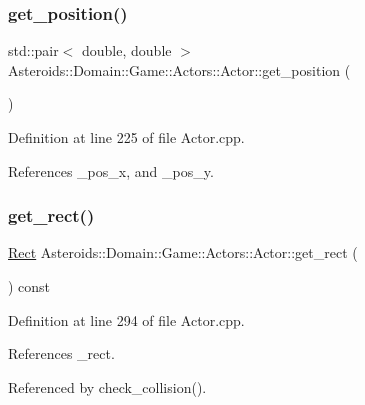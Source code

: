 \subsubsection{\texorpdfstring{get\+\_\+position()}{get\_position()}}
{\footnotesize\ttfamily std\+::pair$<$ double, double $>$ Asteroids\+::\+Domain\+::\+Game\+::\+Actors\+::\+Actor\+::get\+\_\+position (\begin{DoxyParamCaption}{ }\end{DoxyParamCaption})}



Definition at line 225 of file Actor.\+cpp.



References \+\_\+pos\+\_\+x, and \+\_\+pos\+\_\+y.

\mbox{\label{classAsteroids_1_1Domain_1_1Game_1_1Actors_1_1Actor_a445d9ee9ca02625b5385727aa4cbab1b}} 
\subsubsection{\texorpdfstring{get\+\_\+rect()}{get\_rect()}}
{\footnotesize\ttfamily \hyperlink{classAsteroids_1_1Domain_1_1Game_1_1Actors_1_1Rect}{Rect} Asteroids\+::\+Domain\+::\+Game\+::\+Actors\+::\+Actor\+::get\+\_\+rect (\begin{DoxyParamCaption}{ }\end{DoxyParamCaption}) const}



Definition at line 294 of file Actor.\+cpp.



References \+\_\+rect.



Referenced by check\+\_\+collision().

